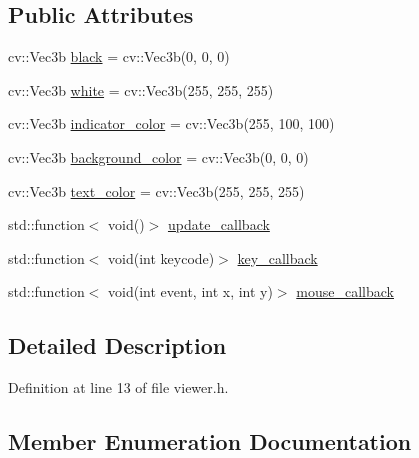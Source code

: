 \subsection*{Public Attributes}
\begin{DoxyCompactItemize}
\item 
cv\+::\+Vec3b \hyperlink{classtlz_1_1viewer_af7c1c138d35a19bee709bc368f10b7fa}{black} = cv\+::\+Vec3b(0, 0, 0)
\item 
cv\+::\+Vec3b \hyperlink{classtlz_1_1viewer_a3dadda68d6b156de3fe6cc68ff9bc623}{white} = cv\+::\+Vec3b(255, 255, 255)
\item 
cv\+::\+Vec3b \hyperlink{classtlz_1_1viewer_a0d5822b6c9ca68bf0edf44d6ff017937}{indicator\+\_\+color} = cv\+::\+Vec3b(255, 100, 100)
\item 
cv\+::\+Vec3b \hyperlink{classtlz_1_1viewer_ad8bf1e38972c92316347477b1b6225bb}{background\+\_\+color} = cv\+::\+Vec3b(0, 0, 0)
\item 
cv\+::\+Vec3b \hyperlink{classtlz_1_1viewer_a483a152f05561ae8f33fafae05a08b5f}{text\+\_\+color} = cv\+::\+Vec3b(255, 255, 255)
\item 
std\+::function$<$ void()$>$ \hyperlink{classtlz_1_1viewer_a7142596a0bf1aac7b0358759651639b4}{update\+\_\+callback}
\item 
std\+::function$<$ void(int keycode)$>$ \hyperlink{classtlz_1_1viewer_a2eb7558722a69604c1d9c96c1b1dcc83}{key\+\_\+callback}
\item 
std\+::function$<$ void(int event, int x, int y)$>$ \hyperlink{classtlz_1_1viewer_a8b095fdc711fecee7f8c5916e0fcc351}{mouse\+\_\+callback}
\end{DoxyCompactItemize}


\subsection{Detailed Description}


Definition at line 13 of file viewer.\+h.



\subsection{Member Enumeration Documentation}
